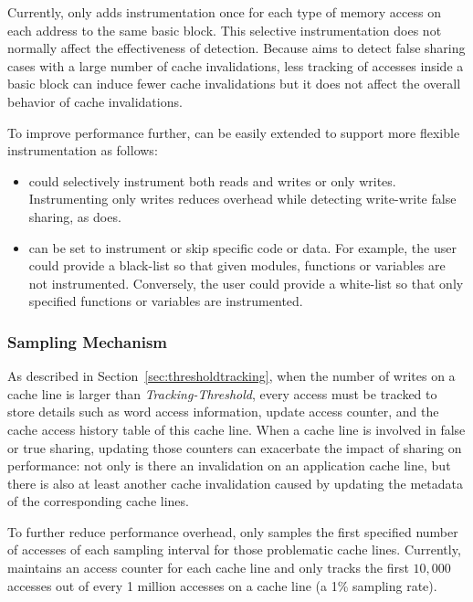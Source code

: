 Currently, \Predator{} only adds instrumentation once for each type of memory access on each address 
to the same basic block. 
This selective instrumentation does not normally affect the effectiveness of detection. 
Because \Predator{} aims to detect false sharing cases with a large number of cache invalidations,
less tracking of accesses inside a basic block can induce fewer cache invalidations 
but it does not affect the overall behavior of cache invalidations. 

To improve performance further,
\Predator{} can be easily extended to support more flexible instrumentation as follows:
\begin{itemize}
\item
\Predator{} could selectively instrument both reads and writes or only writes.
Instrumenting only writes reduces overhead while detecting write-write false sharing, 
as \Sheriff{} does. 
\item
\Predator{} can be set to instrument or skip specific code or data. 
For example, the user could provide a black-list so that given modules,
functions or variables are not instrumented. 
Conversely, the user could provide a white-list so that only specified functions or variables are instrumented. 
\end{itemize}

\subsubsection{Sampling Mechanism}
\label{sec:sample}
As described in Section~\ref{sec:thresholdtracking}, when the number of
writes on a cache line is larger than {\it Tracking-Threshold}, every
access must be tracked to store details such as word access
information, update access counter, and the cache access history table
of this cache line.  When a cache line is involved in false or true
sharing, updating those counters can exacerbate the impact of sharing
on performance: not only is there an invalidation on an application
cache line, but there is also at least another cache invalidation
caused by updating the metadata of the corresponding cache lines.

To further reduce performance overhead, \Predator{} only samples the first specified
number of accesses of each sampling interval for those problematic cache lines. 
Currently, \Predator{} maintains an access counter for each cache line
and only tracks the first $10,000$ accesses out of every 1 million
accesses on a cache line (a 1\% sampling rate).

